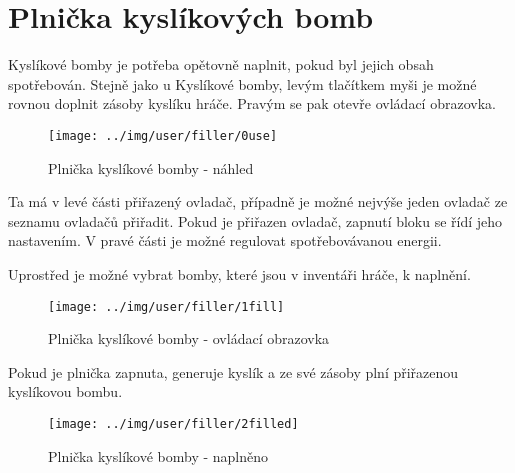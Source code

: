 
\section{Plnička kyslíkových bomb}

Kyslíkové bomby je potřeba opětovně naplnit, pokud byl jejich obsah spotřebován. Stejně jako u Kyslíkové bomby, levým tlačítkem myši je možné rovnou doplnit zásoby kyslíku hráče. Pravým se pak otevře ovládací obrazovka.

\begin{figure}[!h]\centering
\texttt{[image: ../img/user/filler/0use]}

\caption{Plnička kyslíkové bomby - náhled}
\label{fig:user_filler_0use}

\end{figure}

\FloatBarrier

Ta má v levé části přiřazený ovladač, případně je možné nejvýše jeden ovladač ze seznamu ovladačů přiřadit. Pokud je přiřazen ovladač, zapnutí bloku se řídí jeho nastavením. V pravé části je možné regulovat spotřebovávanou energii.

Uprostřed je možné vybrat bomby, které jsou v inventáři hráče, k naplnění.

\begin{figure}[!h]\centering
\texttt{[image: ../img/user/filler/1fill]}

\caption{Plnička kyslíkové bomby - ovládací obrazovka}
\label{fig:user_filler_1fill}

\end{figure}

\FloatBarrier

Pokud je plnička zapnuta, generuje kyslík a ze své zásoby plní přiřazenou kyslíkovou bombu.

\begin{figure}[!h]\centering
\texttt{[image: ../img/user/filler/2filled]}

\caption{Plnička kyslíkové bomby - naplněno}
\label{fig:user_filler_2filled}

\end{figure}



\FloatBarrier